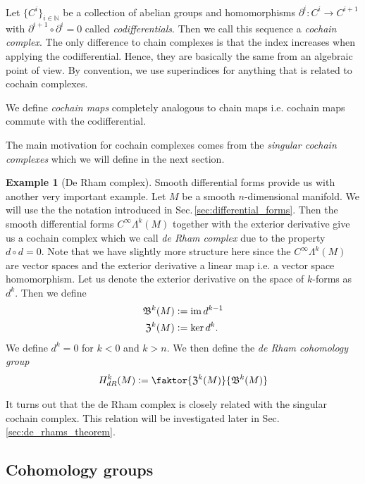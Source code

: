 \documentclass[12pt,a4paper]{article}
\numberwithin{equation}{subsection}
\numberwithin{lemma}{subsection}
\theoremstyle{definition}
\newtheorem{example}[lemma]{Example}
\DeclareMathOperator{\Ima}{im}
\newcommand{\naturalnum}{\mathbb{N}}
\begin{document}
Let $\{ C^i \}_{i\in \naturalnum}$ be a collection of abelian groups
and homomorphisms $\partial^i: C^i \rightarrow C^{i+1}$ with 
$\partial^{i+1} \circ \partial^i = 0$ called \textit{codifferentials}. 
Then we call this sequence a 
\textit{cochain complex}. The only difference to chain complexes
is that the index 
increases when applying the codifferential. Hence, they are 
basically the same from an algebraic point of view.
By convention, 
we use superindices for anything that is related to cochain complexes.

We define \textit{cochain maps} completely analogous to chain maps 
i.e. cochain maps commute with the codifferential.

The main motivation for cochain complexes comes from the 
\textit{singular cochain complexes} which we will define in the next 
section.

\begin{example}[De Rham complex]
    Smooth differential forms provide us with another very important example. 
    Let $M$ be a smooth $n$-dimensional manifold.
    We will use the the notation introduced in 
    Sec.\,\ref{sec:differential_forms}. Then the smooth 
    differential forms $C^\infty \Lambda^k (M)$ together 
    with the exterior derivative give us a cochain complex which we call 
    \textit{de Rham complex} due to the property $d \circ d = 0$. 
    Note that we have slightly more structure here
    since the $C^\infty \Lambda^k (M)$ are vector spaces and the exterior
    derivative a linear map i.e. a vector space homomorphism.
    Let us denote the exterior derivative on 
    the space of $k$-forms as $d^k$. Then we define
    \begin{align*}
        \mathfrak{B}^k(M) &\vcentcolon= \Ima d^{k-1}
        \\ \mathfrak{Z}^k(M) &\vcentcolon= \ker d^k.
    \end{align*}
    We define $d^k = 0$ for $k < 0$ and $k>n$.
    We then define the \textit{de Rham cohomology group} 
    \begin{align*}
        H_{dR}^k(M) \vcentcolon= \faktor{\mathfrak{Z}^k(M)}{\mathfrak{B}^k(M)}
    \end{align*}
    
\end{example}
It turns out that the de Rham complex is closely related with the 
singular cochain complex. This relation will be investigated later in 
Sec.\,\ref{sec:de_rhams_theorem}. %

\subsection{Cohomology groups}
\end{document}
